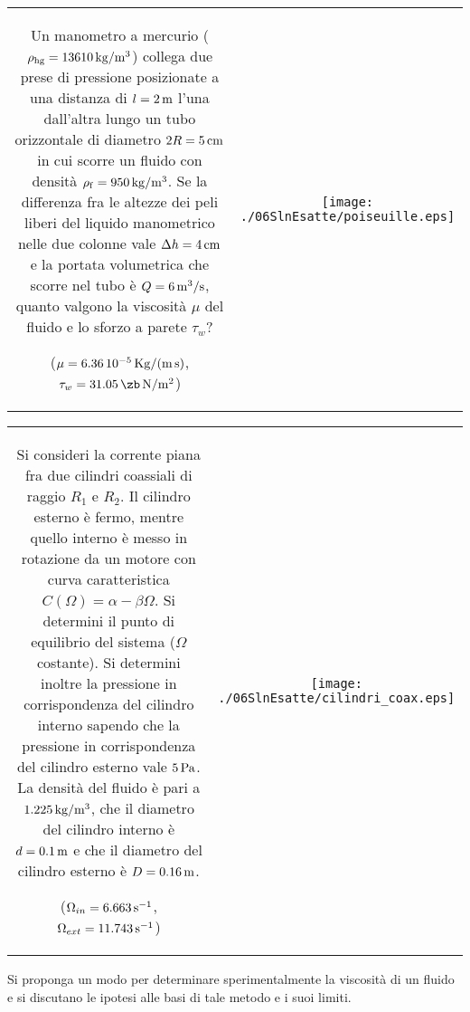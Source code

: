\vspace{1cm}

\noindent
\begin{tabular}{cc}
\begin{minipage}[b]{0.60\textwidth}
\begin{exerciseS}
Un manometro a mercurio ($\rho_{\rm hg} = 13610 \, {\rm kg/m^3}$)
collega due prese di pressione posizionate a una distanza di $l = 2 \,
\rm{m}$ l'una dall'altra lungo un tubo orizzontale di diametro $2R = 5 \,
{\rm cm}$ in cui scorre un fluido con densità $\rho_{\rm f} = 950 \, {\rm
kg/m^3}$. Se la differenza fra le altezze dei peli liberi del 
liquido manometrico nelle due colonne
vale $\Delta h = 4 \, \rm{cm}$ e la portata volumetrica che scorre nel tubo è 
$Q= 6\, \rm{m^3/s}$,
quanto valgono la viscosità $\mu$ del fluido e lo sforzo a parete
$\tau_w$?

($\mu = 6.36\,10^{-5} \, \rm{Kg/(m\, s)}$,
$\tau_w = 31.05\, \zb\, \rm{N/m^2}$)
\end{exerciseS}
\end{minipage}
&
\begin{minipage}[b]{0.35\textwidth}
   \begin{center}
   \texttt{[image: ./06SlnEsatte/poiseuille.eps]}
   \end{center}
\end{minipage}
\end{tabular}

\vspace{1cm}

\noindent
\begin{tabular}{cc}
\begin{minipage}{0.60\textwidth}
\begin{exerciseS}
Si consideri la corrente piana fra due cilindri coassiali di raggio $R_1$ e $R_2$.
Il cilindro esterno è fermo, mentre quello interno è messo in rotazione da
 un motore con curva caratteristica $C(\Omega) = \alpha - \beta \Omega$.
Si determini il punto di equilibrio del sistema ($\Omega$ costante).
Si determini inoltre la pressione in corrispondenza del cilindro interno sapendo che
la pressione in corrispondenza del cilindro esterno vale $5\, \textrm{Pa}$.
La densit\`a del fluido \`e pari a $1.225\, \textrm{kg}/\textrm{m}^3$,
che il diametro del cilindro interno \`e $d =0.1 \,\textrm{m}$ e che il diametro 
del cilindro esterno \`e $D = 0.16 \, \textrm{m}$.
 
($\Omega_{in}=6.663\, {\rm s^{-1}}$, $\Omega_{ext}=11.743\, {\rm s^{-1}}$)
\end{exerciseS}
\end{minipage}
&
\begin{minipage}{0.35\textwidth}
   \begin{center}
   \texttt{[image: ./06SlnEsatte/cilindri\_coax.eps]}
   \end{center}
\end{minipage}
\end{tabular}

\vspace{1cm}

\begin{exerciseS}
 Si proponga un modo per determinare sperimentalmente la viscosità di un fluido e si
 discutano le ipotesi alle basi di tale metodo e i suoi limiti.
\end{exerciseS}




